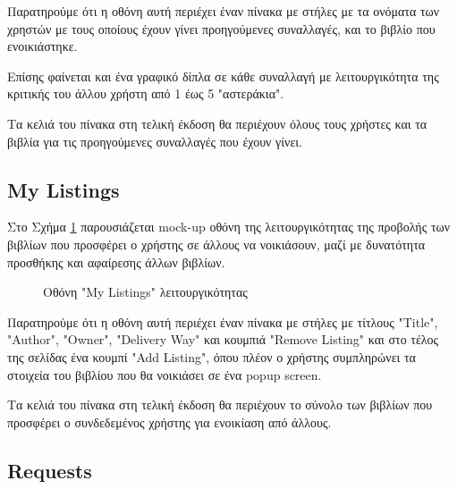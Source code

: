 \documentclass[12pt,a4paper]{article}
\begin{document}
Παρατηρούμε ότι η οθόνη αυτή περιέχει έναν πίνακα με στήλες με τα ονόματα των χρηστών με τους οποίους έχουν γίνει προηγούμενες συναλλαγές, και το βιβλίο που ενοικιάστηκε.

Επίσης φαίνεται και ένα γραφικό δίπλα σε κάθε συναλλαγή με λειτουργικότητα της κριτικής του άλλου χρήστη από 1 έως 5 "αστεράκια".

Τα κελιά του πίνακα στη τελική έκδοση θα περιέχουν όλους τους χρήστες και τα βιβλία για τις προηγούμενες συναλλαγές που έχουν γίνει.

\subsection{My Listings}

Στο Σχήμα \ref{Οθόνη "My Listings" λειτουργικότητας} παρουσιάζεται mock-up οθόνη της λειτουργικότητας της προβολής των βιβλίων που προσφέρει ο χρήστης σε άλλους να νοικιάσουν, μαζί με δυνατότητα προσθήκης και αφαίρεσης άλλων βιβλίων.

\begin{figure}[H]
	\caption{Οθόνη "My Listings" λειτουργικότητας}
	\label{Οθόνη "My Listings" λειτουργικότητας}
\end{figure}

Παρατηρούμε ότι η οθόνη αυτή περιέχει έναν πίνακα με στήλες με τίτλους "Title", "Author", "Owner", "Delivery Way" και κουμπιά "Remove Listing" και στο τέλος της σελίδας ένα κουμπί "Add Listing", όπου πλέον ο χρήστης συμπληρώνει τα στοιχεία του βιβλίου που θα νοικιάσει σε ένα popup screen.

Τα κελιά του πίνακα στη τελική έκδοση θα περιέχουν το σύνολο των βιβλίων που προσφέρει ο συνδεδεμένος χρήστης για ενοικίαση από άλλους.

\subsection{Requests}
\end{document}
